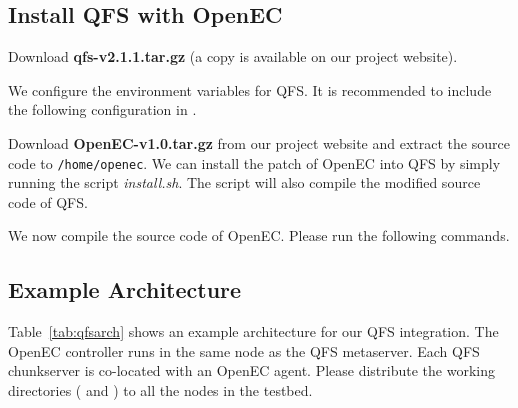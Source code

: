 \documentclass[letterpaper,12pt]{article}
\newcommand{\openec}{{\sf\small OpenEC}\xspace}
\begin{document}
\subsection{Install QFS with OpenEC}

Download {\bf qfs-v2.1.1.tar.gz} (a copy is available on our project website).

\begin{center}
\noindent{}
\end{center}

We configure the environment variables for QFS. It is recommended to include
the following configuration in .

\begin{center}
\noindent{}
\end{center}

Download {\bf OpenEC-v1.0.tar.gz} from our project website and extract the
source code to {\tt /home/openec}.  We can install the patch of \openec into
QFS by simply running the script {\sl install.sh}.  The script will also
compile the modified source code of QFS.

\begin{center}
\noindent{}
\end{center}

We now compile the source code of OpenEC. Please run the following commands.

\begin{center}
\noindent{}
\end{center}

\subsection{Example Architecture}

Table~\ref{tab:qfsarch} shows an example architecture for our QFS integration.
The \openec controller runs in the same node as the QFS metaserver.
Each QFS chunkserver is co-located with an \openec agent. Please distribute
the working directories ( and ) to all 
the nodes in the testbed.
\end{document}
